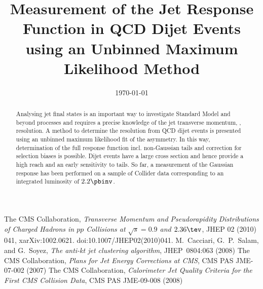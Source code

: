 \documentclass[a4paper]{cmspaper} %
\begin{document}
\begin{titlepage}
  \date{\today}
  \title{Measurement of the Jet \pt Response Function in QCD Dijet
    Events using an Unbinned Maximum Likelihood Method}
  \begin{abstract}
    Analysing jet final states is an important way to investigate
    Standard Model and beyond processes and requires a precise
    knowledge of the jet transverse momentum, \textit{\pt}, resolution.	
    A method to determine the resolution from QCD dijet
    events is presented using an unbinned maximum
    likelihood fit of the \pt asymmetry.
    In this way, determination of the full response function incl. non-Gaussian
    tails and correction for selection biases is possible.
    Dijet events have a large cross section and hence provide a
    high \pt reach and an early sensitivity to tails.
    So far, a measurement of the Gaussian response has been performed
    on a sample of Collider data corresponding to an integrated luminosity of $2.2\pbinv$.
	
  \end{abstract}
\end{titlepage}
\tableofcontents







%




\begin{thebibliography}{9}
 The CMS Collaboration,
  \textit{Transverse Momentum and Pseudorapidity Distributions of
    Charged Hadrons in $pp$ Collisions at \mbox{$\sqrt{s} = 0.9$} and $2.36\tev$}, JHEP 02 (2010) 041,
 xarXiv:1002.0621. doi:10.1007/JHEP02(2010)041.
 M.~Cacciari, G.~P.~Salam, and G.~Soyez,
  \textit{The anti-kt jet clustering algorithm},
  JHEP~0804:063 (2008)
 The CMS Collaboration,
  \textit{Plans for Jet Energy Corrections at CMS},
  CMS PAS JME-07-002 (2007)
  The CMS Collaboration,
  \textit{Calorimeter Jet Quality Criteria for the First CMS Collision Data},
  CMS PAS JME-09-008 (2008)
\end{thebibliography}
\end{document}
